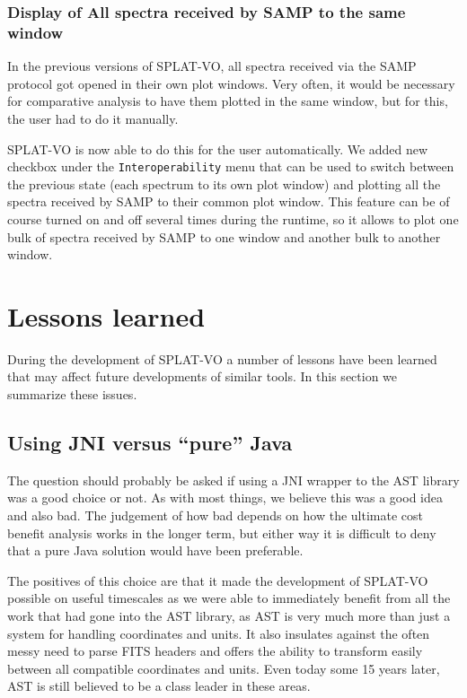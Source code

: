 \documentclass[final,authoryear,5p,times,twocolumn]{elsarticle}
\begin{document}
\subsubsection{Display of All  spectra received by SAMP to the same  window}

In the previous versions of SPLAT-VO, all spectra received via the SAMP
protocol got opened in their own plot windows. Very often, it would be
necessary for comparative analysis to have them plotted in the same
window, but for this, the user had to do it manually.

SPLAT-VO is now able to do this
for the user automatically. We added new checkbox under the
\texttt{Interoperability} menu that can be used to switch between the previous
state (each spectrum to its own plot window) and plotting all the
spectra received by SAMP to their common plot window. This feature
can be of course turned on and off several times during the runtime,
so it allows to plot one bulk of spectra received by SAMP to one
window and another bulk to another window.

\section{Lessons learned}

During the development of SPLAT-VO a number of lessons have been
learned that may affect future developments of similar tools. In this
section we summarize these issues.

\subsection{Using JNI versus ``pure'' Java}
\label{sec:jniast-lesson}

The question should probably be asked if using a JNI wrapper to the
AST library was a good choice or not. As with most things, we believe
this was a good idea and also bad. The judgement of how bad depends on
how the ultimate cost benefit analysis works in the longer term, but
either way it is difficult to deny that a pure Java solution would
have been preferable.

The positives of this choice are that it made the development of
SPLAT-VO possible on useful timescales as we were able to immediately
benefit from all the work that had gone into the AST library, as AST
is very much more than just a system for handling coordinates and
units. It also insulates against the often messy need to parse FITS
headers and offers the ability to transform easily between all
compatible coordinates and units. Even today some 15 years later, AST
is still believed to be a class leader in these areas.
\end{document}
